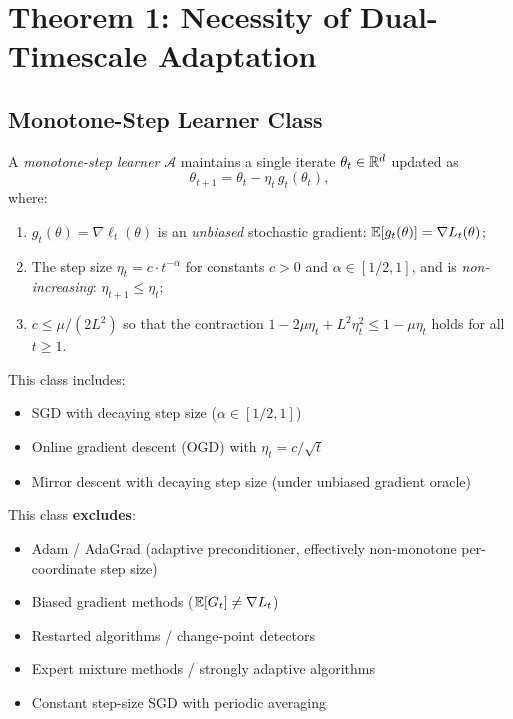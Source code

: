 \section{Theorem 1: Necessity of Dual-Timescale Adaptation}
\label{sec:theorem1}

\subsection{Monotone-Step Learner Class}

\begin{definition}
\label{def:monotone-step}
A \emph{monotone-step learner} $\mathcal{A}$ maintains a single iterate
$\theta_t \in \mathbb{R}^d$ updated as
\[
  \theta_{t+1} = \theta_t - \eta_t\, g_t(\theta_t),
\]
where:
\begin{enumerate}[nosep]
  \item $g_t(\theta) = \nabla \ell_t(\theta)$ is an \emph{unbiased}
        stochastic gradient: $\mathbb{E}[g_t(\theta)] = \nabla L_t(\theta)$;
  \item The step size $\eta_t = c \cdot t^{-\alpha}$ for constants
        $c > 0$ and $\alpha \in [1/2, 1]$, and is \emph{non-increasing}:
        $\eta_{t+1} \leq \eta_t$;
  \item $c \leq \mu/(2L^2)$ so that the contraction
        $1 - 2\mu\eta_t + L^2\eta_t^2 \leq 1 - \mu\eta_t$ holds
        for all $t \geq 1$.
\end{enumerate}
This class includes:
\begin{itemize}[nosep]
  \item SGD with decaying step size ($\alpha \in [1/2,1]$)
  \item Online gradient descent (OGD) with $\eta_t = c/\sqrt{t}$
  \item Mirror descent with decaying step size (under unbiased gradient oracle)
\end{itemize}
This class \textbf{excludes}:
\begin{itemize}[nosep]
  \item Adam / AdaGrad (adaptive preconditioner, effectively non-monotone
        per-coordinate step size)
  \item Biased gradient methods ($\mathbb{E}[G_t] \neq \nabla L_t$)
  \item Restarted algorithms / change-point detectors
  \item Expert mixture methods / strongly adaptive algorithms
  \item Constant step-size SGD with periodic averaging
\end{itemize}
\end{definition}

